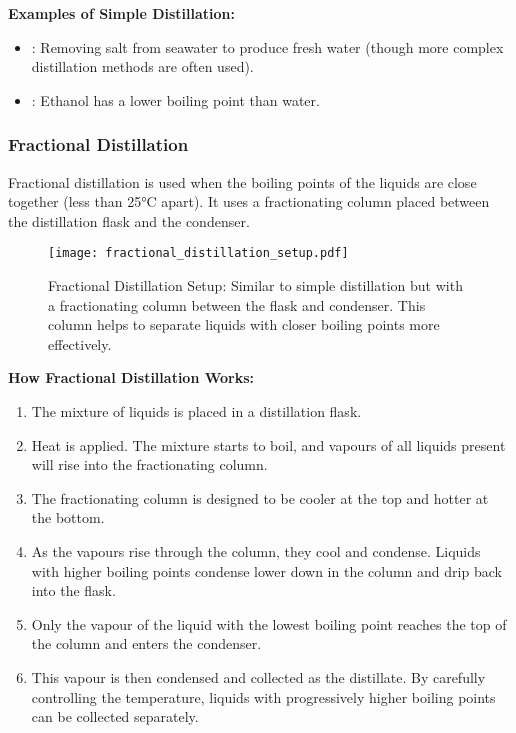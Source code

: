 \begin{example}
\textbf{Examples of Simple Distillation:}
\begin{itemize}
    \item {}: Removing salt from seawater to produce fresh water (though more complex distillation methods are often used).
    \item {}: Ethanol has a lower boiling point than water.
\end{itemize}
\end{example}

\subsubsection{Fractional Distillation}

Fractional distillation is used when the boiling points of the liquids are close together (less than 25°C apart). It uses a fractionating column placed between the distillation flask and the condenser.

\begin{figure}
\centering
\texttt{[image: fractional\_distillation\_setup.pdf]}
\caption{Fractional Distillation Setup: Similar to simple distillation but with a fractionating column between the flask and condenser. This column helps to separate liquids with closer boiling points more effectively.}
\end{figure}

\textbf{How Fractional Distillation Works:}
\begin{enumerate}
    \item The mixture of liquids is placed in a distillation flask.
    \item Heat is applied. The mixture starts to boil, and vapours of all liquids present will rise into the fractionating column.
    \item The fractionating column is designed to be cooler at the top and hotter at the bottom.
    \item As the vapours rise through the column, they cool and condense. Liquids with higher boiling points condense lower down in the column and drip back into the flask.
    \item Only the vapour of the liquid with the lowest boiling point reaches the top of the column and enters the condenser.
    \item This vapour is then condensed and collected as the distillate. By carefully controlling the temperature, liquids with progressively higher boiling points can be collected separately.
\end{enumerate}

